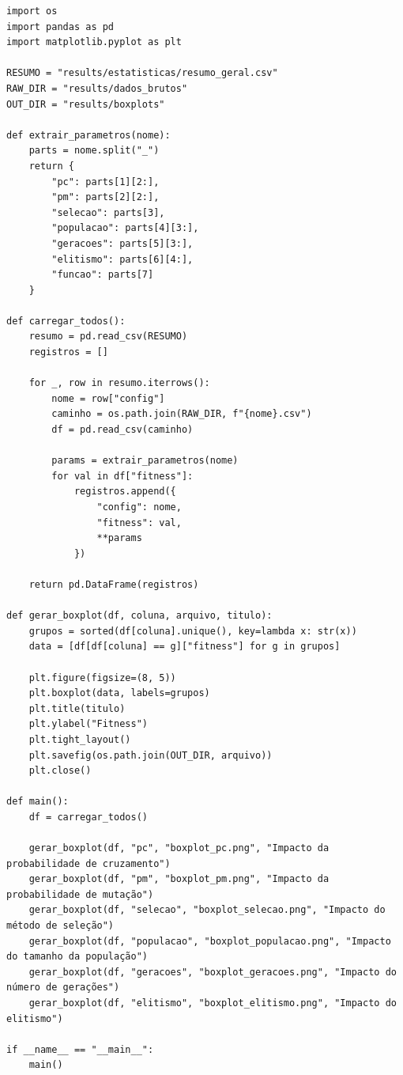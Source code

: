 \documentclass[a4paper,12pt]{article}
\begin{document}
\begin{lstlisting}[caption={experiments/boxplots\_parametros.py}]
import os
import pandas as pd
import matplotlib.pyplot as plt

RESUMO = "results/estatisticas/resumo_geral.csv"
RAW_DIR = "results/dados_brutos"
OUT_DIR = "results/boxplots"

def extrair_parametros(nome):
    parts = nome.split("_")
    return {
        "pc": parts[1][2:],
        "pm": parts[2][2:],
        "selecao": parts[3],
        "populacao": parts[4][3:],
        "geracoes": parts[5][3:],
        "elitismo": parts[6][4:],
        "funcao": parts[7]
    }

def carregar_todos():
    resumo = pd.read_csv(RESUMO)
    registros = []

    for _, row in resumo.iterrows():
        nome = row["config"]
        caminho = os.path.join(RAW_DIR, f"{nome}.csv")
        df = pd.read_csv(caminho)

        params = extrair_parametros(nome)
        for val in df["fitness"]:
            registros.append({
                "config": nome,
                "fitness": val,
                **params
            })

    return pd.DataFrame(registros)

def gerar_boxplot(df, coluna, arquivo, titulo):
    grupos = sorted(df[coluna].unique(), key=lambda x: str(x))
    data = [df[df[coluna] == g]["fitness"] for g in grupos]

    plt.figure(figsize=(8, 5))
    plt.boxplot(data, labels=grupos)
    plt.title(titulo)
    plt.ylabel("Fitness")
    plt.tight_layout()
    plt.savefig(os.path.join(OUT_DIR, arquivo))
    plt.close()

def main():
    df = carregar_todos()

    gerar_boxplot(df, "pc", "boxplot_pc.png", "Impacto da probabilidade de cruzamento")
    gerar_boxplot(df, "pm", "boxplot_pm.png", "Impacto da probabilidade de mutação")
    gerar_boxplot(df, "selecao", "boxplot_selecao.png", "Impacto do método de seleção")
    gerar_boxplot(df, "populacao", "boxplot_populacao.png", "Impacto do tamanho da população")
    gerar_boxplot(df, "geracoes", "boxplot_geracoes.png", "Impacto do número de gerações")
    gerar_boxplot(df, "elitismo", "boxplot_elitismo.png", "Impacto do elitismo")

if __name__ == "__main__":
    main()
\end{lstlisting}

\newpage


\end{document}
